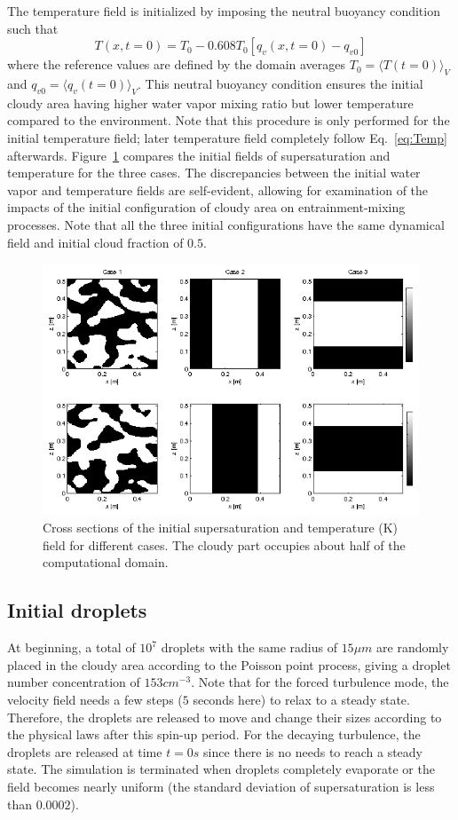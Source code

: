 \documentclass[draft,linenumbers]{AGUJournal}
\newcommand{\Eq}[1]{Eq.~\eqref{#1}} \newcommand{\Fig}[1]{Figure~\ref{#1}}
\begin{document}
The temperature field is initialized by imposing the neutral buoyancy condition such that \citep{Kumar14}
\begin{equation}
T(x,t = 0) = T_0 - 0.608T_0[q_v(x,t = 0) - q_{v0}]
\end{equation}
where the reference values are defined by the domain averages $T_0 = \langle T(t=0)\rangle_V$ and $q_{v0} = \langle q_v(t=0)\rangle_V$. This neutral buoyancy condition ensures the initial cloudy area having higher water vapor mixing ratio but lower temperature compared to the environment. Note that this procedure is only performed for the initial temperature field; later temperature field completely follow \Eq{eq:Temp} afterwards. \Fig{fig:slice_case123} compares the initial fields of  supersaturation and temperature for the three cases. The discrepancies between the initial water vapor 
and temperature fields are self-evident, allowing for examination of the impacts of the initial 
configuration of cloudy area on entrainment-mixing processes. Note that all the three initial 
configurations have the same dynamical field and initial cloud fraction of $0.5$.

\begin{figure}\centering
\includegraphics[width=0.9\linewidth]{Figures/init_vapor_supersat}
\caption{Cross sections of the initial supersaturation and temperature (K) field for different cases. The cloudy part occupies about half of the computational domain.\label{fig:slice_case123}}
\end{figure}

\subsection{Initial droplets}

At beginning, a total of $10^{7}$ droplets with the same radius of $15\mu m$ are randomly placed in the cloudy area according to the Poisson point process, giving a droplet number concentration of $153{cm}^{-3}$. Note that for the forced turbulence mode, the velocity field needs a few steps ($5$ seconds here) to relax to a steady state. Therefore, the droplets are released to move and change their sizes according to the physical laws after this spin-up period. For the decaying turbulence, the droplets are released at time $t = 0s$ since there is no needs to reach a steady state. The simulation is terminated when droplets completely evaporate or the field becomes nearly uniform (the standard deviation of supersaturation is less than $0.0002$). 
\end{document}
